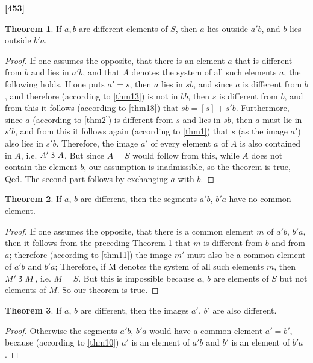 \documentclass[leqno, hidelinks]{article}
\theoremstyle{definition}
\newtheorem{theorem}{Theorem}
\newcommand\partof{\mathrel{\raisebox{0.45ex}{$\mathfrak{3}$}}}
\begin{document}
\noindent \textbf{[453]}

\begin{theorem}\label{thm19}
If $a, b$ are different elements of $S$, then $a$ lies outside $a'b$, and $b$ lies outside $b'a$.\end{theorem}

\begin{proof}
If one assumes the opposite, that there is an element $a$ that is different from $b$ and lies in $a'b$, and that $A$ denotes the system of all such elements $a$, the following holds.
If one puts $a'=s$, then $a$ lies in $sb$, and since $a$ is different from $b$, and therefore (according to \ref{thm13}) is not in $bb$, then $s$ is different from $b$, and from this it follows (according to \ref{thm18}) that $sb = [s] + s 'b$.
Furthermore, since $a$ (according to \ref{thm2}) is different from $s$ and lies in $sb$, then $a$ must lie in $s'b$, and from this it follows again (according to \ref{thm1}) that $s$ (as the image $a'$) also lies in $s'b$.
Therefore, the image $a'$ of every element $a$ of $A$ is also contained in $A$, i.e. $A' \partof A$.
But since $A=S$ would follow from this, while $A$ does not contain the element $b$, our assumption is inadmissible, so the theorem is true, Qed.
The second part follows by exchanging $a$ with $b$.\end{proof}

\begin{theorem}\label{thm20}
If $a$, $b$ are different, then the segments $a'b$, $b'a$ have no common element.
\end{theorem}

\begin{proof}
If one assumes the opposite, that there is a common element $m$ of $a'b$, $b'a$, then it follows from the preceding Theorem \ref{thm19} that $m$ is different from $b$ and from $a$; therefore (according to \ref{thm11}) the image $m'$ must also be a common element of $a'b$ and $b'a$;
Therefore, if M denotes the system of all such elements $m$, then $M' \partof M$, i.e. $M=S$. But this is impossible because $a$, $b$ are elements of $S$ but not elements of $M$. So our theorem is true.
\end{proof}

\begin{theorem}\label{thm21}
If $a$, $b$ are different, then the images $a'$, $b'$ are also different.
\end{theorem}

\begin{proof}
Otherwise the segments $a'b$, $b'a$ would have a common element $a'=b'$, because (according to \ref{thm10}) $a'$ is an element of $a'b$ and $b'$ is an element of $b'a$.
\end{proof}
\end{document}
